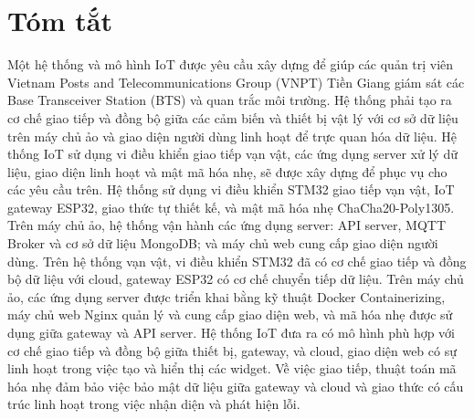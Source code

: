 \chapter*{Tóm tắt}
\label{Abstract}

Một hệ thống và mô hình IoT được yêu cầu xây dựng để giúp các quản trị viên Vietnam Posts and Telecommunications Group (VNPT) Tiền Giang giám sát các Base Transceiver Station (BTS) và quan trắc môi trường. Hệ thống phải tạo ra cơ chế giao tiếp và đồng bộ giữa các cảm biến và thiết bị vật lý với cơ sở dữ liệu trên máy chủ ảo và giao diện người dùng linh hoạt để trực quan hóa dữ liệu. Hệ thống IoT sử dụng vi điều khiển giao tiếp vạn vật, các ứng dụng server xử lý dữ liệu, giao diện linh hoạt và mật mã hóa nhẹ, sẽ được xây dựng để phục vụ cho các yêu cầu trên. Hệ thống sử dụng vi điều khiển STM32 giao tiếp vạn vật, IoT gateway ESP32, giao thức tự thiết kế, và mật mã hóa nhẹ ChaCha20-Poly1305. Trên máy chủ ảo, hệ thống vận hành các ứng dụng server: API server, MQTT Broker và cơ sở dữ liệu MongoDB; và máy chủ web cung cấp giao diện người dùng. Trên hệ thống vạn vật, vi điều khiển STM32 đã có cơ chế giao tiếp và đồng bộ dữ liệu với cloud, gateway ESP32 có cơ chế chuyển tiếp dữ liệu. Trên máy chủ ảo, các ứng dụng server được triển khai bằng kỹ thuật Docker Containerizing, máy chủ web Nginx quản lý và cung cấp giao diện web, và mã hóa nhẹ được sử dụng giữa gateway và API server. Hệ thống IoT đưa ra có mô hình phù hợp với cơ chế giao tiếp và đồng bộ giữa thiết bị, gateway, và cloud, giao diện web có sự linh hoạt trong việc tạo và hiển thị các widget. Về việc giao tiếp, thuật toán mã hóa nhẹ đảm bảo việc bảo mật dữ liệu giữa gateway và cloud và giao thức có cấu trúc linh hoạt trong việc nhận diện và phát hiện lỗi.